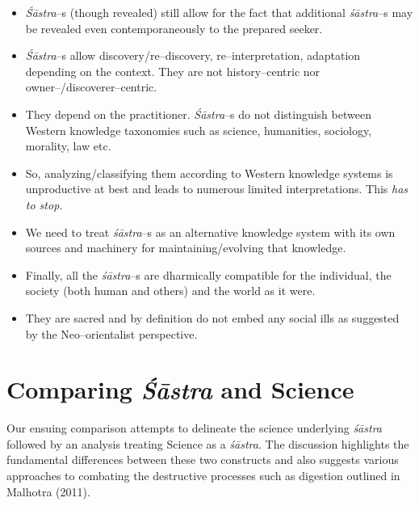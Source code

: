 \begin{itemize}
\item \textit{Śāstra}–s (though revealed) still allow for the fact that additional \textit{śāstra}–s may be revealed even contemporaneously to the prepared seeker.

 \item \textit{Śāstra}–s allow discovery/re–discovery, re–interpretation, adaptation depending on the context. They are not history–centric nor owner–/discoverer–centric. 

 \item They depend on the practitioner. \textit{Śāstra}–s do not distinguish between Western knowledge taxonomies such as science, humanities, sociology, morality, law etc.

 \newpage

 \item So, analyzing/classifying them according to Western knowledge systems is unproductive at best and leads to numerous limited interpretations. This \textit{has to stop.}

 \item We need to treat \textit{śāstra}–s as an alternative knowledge system with its own sources and machinery for maintaining/evolving that knowledge.

 \item Finally, all the \textit{śāstra}–s are dharmically compatible for the individual, the society (both human and others) and the world as it were.

 \item They are sacred and by definition do not embed any social ills as suggested by the Neo–orientalist perspective.

\end{itemize}


\section*{Comparing \textit{Śāstra} and Science}

Our ensuing comparison attempts to delineate the science underlying \textit{śāstra} followed by an analysis treating Science as a \textit{śāstra}. The discussion highlights the fundamental differences between these two constructs and also suggests various approaches to combating the destructive processes such as digestion outlined in Malhotra (2011).


